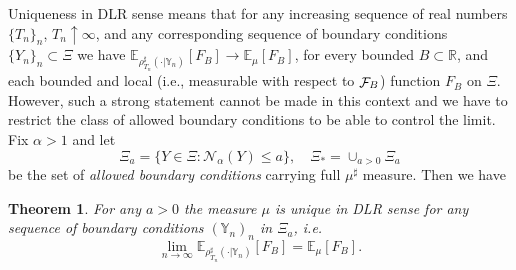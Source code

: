 \documentclass[a4paper,11pt]{article}
\newtheorem{theorem}{Theorem}[section]
\newcommand{\R}{\mathbb{R}}
\newcommand{\YY}{\mathbb{Y}}
\newcommand{\F}{\mathop{\mathrm{{\cal F}}}\nolimits}
\begin{document}
Uniqueness in DLR sense means that for any increasing sequence of real 
numbers $\{T_n\}_n$, $T_n \uparrow \infty$, and any corresponding 
sequence of boundary conditions $\{Y_n\}_n \subset \Xi$ we have 
$\mathbb{E}_{\rho^\sharp_{T_n}(\cdot |\YY_n)}[F_B] \to \mathbb{E}_\mu[F_B]$, 
for every bounded $B \subset \R$, and each bounded and local (i.e., 
measurable with respect to $\F_B$) function $F_B$ on $\Xi$. However,
such a strong statement cannot be made in this context and we have to
restrict the class of allowed boundary conditions to be able to
control the limit. Fix $\alpha > 1$ and let
\begin{equation}
\Xi_a = \{Y \in \Xi : \mathcal{N}_\alpha(Y) \le a \},
\quad \Xi_* = \cup_{a > 0} \Xi_a
\end{equation} 
be the set of \emph{allowed boundary conditions} carrying full 
$\mu^\sharp$ measure. Then we have
%
\begin{theorem}
\label{th:uniq}
For any $a>0$ the measure $\mu$ is unique in DLR sense for any 
sequence of boundary conditions $(\YY_n)_n$ in $\Xi_a$, i.e.
\begin{equation}
\lim_{n\to\infty} \mathbb{E}_{\rho^\sharp_{T_n}(\cdot|\YY_n)}[F_B] =
\mathbb{E}_\mu[F_B].
\label{dlruniq}
\end{equation}
\end{theorem}
%
\end{document}
